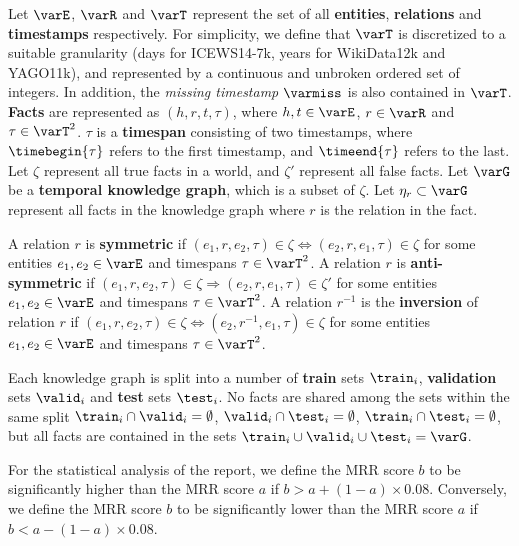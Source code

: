 Let $\varE$, $\varR$ and $\varT$ represent the set of all \textbf{entities}, \textbf{relations} and \textbf{timestamps} respectively. For simplicity, we define that $\varT$ is discretized to a suitable granularity (days for \mbox{ICEWS14-7k}, years for WikiData12k and YAGO11k), and represented by a continuous and unbroken ordered set of integers. In addition, the \textit{missing timestamp} $\varmiss$ is also contained in $\varT$. \textbf{Facts} are represented as $(h, r, t, \tau)$, where $h, t \in \varE$, $r \in \varR$ and $\tau \in \varT^2$. $\tau$ is a \textbf{timespan} consisting of two timestamps, where $\timebegin{\tau}$ refers to the first timestamp, and $\timeend{\tau}$ refers to the last. Let $\zeta$ represent all true facts in a world, and $\zeta'$ represent all false facts. Let $\varG$ be a \textbf{temporal knowledge graph}, which is a subset of $\zeta$. Let $\eta_r \subset \varG$ represent all facts in the knowledge graph where $r$ is the relation in the fact.


A relation $r$ is \textbf{symmetric} if $(e_1, r, e_2, \tau) \in \zeta \Leftrightarrow (e_2, r, e_1, \tau) \in \zeta$ for some entities $e_1, e_2 \in \varE$ and timespans $\tau \in \varT^2$.
A relation $r$ is \textbf{anti-symmetric} if $(e_1, r, e_2, \tau) \in \zeta \Rightarrow (e_2, r, e_1, \tau) \in \zeta'$ for some entities $e_1, e_2 \in \varE$ and timespans $\tau \in \varT^2$.
A relation $r^{-1}$ is the \textbf{inversion} of relation $r$ if $(e_1, r, e_2, \tau) \in \zeta \Leftrightarrow (e_2, r^{-1}, e_1, \tau) \in \zeta$ for some entities $e_1, e_2 \in \varE$ and timespans $\tau \in \varT^2$.

Each knowledge graph is split into a number of \textbf{train} sets $\train_i$, \textbf{validation} sets $\valid_i$ and \textbf{test} sets $\test_i$. No facts are shared among the sets within the same split $\train_i \cap \valid_i = \emptyset$, $\valid_i \cap \test_i = \emptyset$, $\train_i \cap \test_i = \emptyset$, but all facts are contained in the sets $\train_i \cup \valid_i \cup \test_i = \varG$.

For the statistical analysis of the report, we define the MRR score $b$ to be significantly higher than the MRR score $a$ if $b > a + (1-a) \times 0.08$. Conversely, we define the MRR score $b$ to be significantly lower than the MRR score $a$ if $b < a - (1-a) \times 0.08$.

